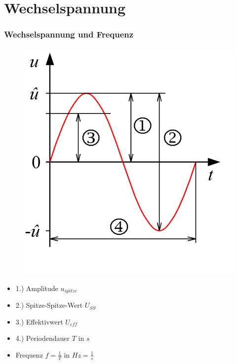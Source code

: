 \section*{Wechsel\-spannung}
\begin{frame}
  \frametitle{Wechselspannung und Frequenz}
  \begin{minipage}{0.4\textwidth}
    \begin{figure}
      \includegraphics[width=.8\textwidth]{e02/Wechselspannung.png}
      \end{figure}
  \end{minipage}
  \begin{minipage}{0.4\textwidth}
    \begin{itemize}
      \item 1.) Amplitude $u_{spitze}$ 
      \item 2.) Spitze-Spitze-Wert $U_{SS}$
      \item 3.) Effektivwert $U_{eff}$
      \item 4.) Periodendauer $T$ in $s$
      \item Frequenz $f=\frac{1}{T}$ in $Hz = \frac{1}{s}$
    \end{itemize}
  \end{minipage}
\end{frame}
